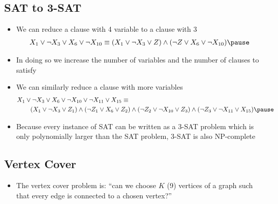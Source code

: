 \begin{slide}
\section[-1]{SAT to 3-SAT}

\begin{PauseHighLight}
  \begin{itemize}
  \item We can reduce a clause with 4 variable to a clause with 3
    \begin{align*}
      X_1 \vee \neg X_3 \vee  X_6 \vee \neg X_{10}
      \equiv (X_1 \vee \neg X_3 \vee Z) \wedge (\neg Z \vee  X_6 \vee
      \neg X_{10})\pause
    \end{align*}
  \item In doing so we increase the number of variables and the number
    of clauses to satisfy\pause
  \item We can similarly reduce a clause with more variables
    {\small
      \begin{align*}
        X_1 \vee \neg X_3 \vee  X_6 \vee \neg X_{10} \vee \neg X_{11} 
        \vee X_{15} 
        \equiv \hspace{8cm} \\
        (X_1 \vee \neg X_3 \vee Z_1) \wedge (\neg Z_1 \vee  X_6
        \vee Z_2) \wedge (\neg Z_2 \vee \neg X_{10} \vee Z_3) 
        \wedge (\neg Z_3 \vee \neg X_{11} \vee X_{15})\pause
      \end{align*}}
  \item Because every instance of SAT can be written as a 3-SAT problem
    which is only polynomially larger than the SAT problem, 3-SAT is
    also NP-complete\pause
  \end{itemize}
\end{PauseHighLight}

\end{slide}



\begin{slide}
\section[-2]{Vertex Cover}
\pausebuild
\color{TwoColor}
\begin{itemize}
\item The vertex cover problem is: ``can we choose $K$ (9) vertices of a
    graph such that every edge is connected to a chosen vertex?''\pauseh
  \vspace*{-1cm}
  \begin{center}\color{TextColor}
    \pause
  \end{center}
  \vspace*{-1cm}
\color{TwoColor}
\end{itemize}

\end{slide}

